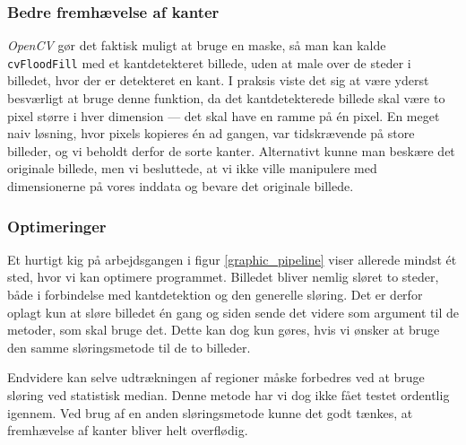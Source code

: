 {\subsubsection{Bedre fremhævelse af kanter}
\emph{OpenCV} gør det faktisk muligt at bruge en maske, så man kan kalde
\texttt{cvFloodFill} med et kantdetekteret billede, uden at male over de
steder i billedet, hvor der er detekteret en kant. I praksis viste det
sig at være yderst besværligt at bruge denne funktion, da det
kantdetekterede billede skal være to pixel større i hver dimension ---
det skal have en ramme på én pixel. En meget naiv løsning, hvor pixels
kopieres én ad gangen, var tidskrævende på store billeder, og vi beholdt
derfor de sorte kanter.  Alternativt kunne man beskære det originale
billede, men vi besluttede, at vi ikke ville manipulere med
dimensionerne på vores inddata og bevare det originale billede.

\subsubsection{Optimeringer}
Et hurtigt kig på arbejdsgangen i figur \ref{graphic_pipeline} viser
allerede mindst ét sted, hvor vi kan optimere programmet. Billedet
bliver nemlig sløret to steder, både i forbindelse med kantdetektion og
den generelle sløring. Det er derfor oplagt kun at sløre billedet én
gang og siden sende det videre som argument til de metoder, som skal
bruge det. Dette kan dog kun gøres, hvis vi ønsker at bruge den samme
sløringsmetode til de to billeder.

Endvidere kan selve udtrækningen af regioner måske forbedres ved at
bruge sløring ved statistisk median. Denne metode har vi dog ikke fået
testet ordentlig igennem. Ved brug af en anden sløringsmetode kunne det
godt tænkes, at fremhævelse af kanter bliver helt overflødig.

}

